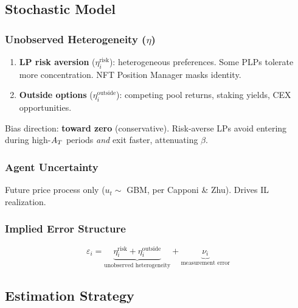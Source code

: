 
\subsection{Stochastic Model}\label{subsec:econ-stochastic}

\subsubsection{Unobserved Heterogeneity ($\eta$)}

\begin{enumerate}
  \item \textbf{LP risk aversion} ($\eta_i^{\text{risk}}$): heterogeneous
    preferences. Some PLPs tolerate more concentration. NFT Position Manager
    masks identity.

  \item \textbf{Outside options} ($\eta_i^{\text{outside}}$): competing pool
    returns, staking yields, CEX opportunities.
\end{enumerate}

Bias direction: \textbf{toward zero} (conservative). Risk-averse LPs avoid
entering during high-$A_T$ periods \emph{and} exit faster, attenuating
$\beta$.

\subsubsection{Agent Uncertainty}

Future price process only ($u_t \sim$ GBM, per Capponi \& Zhu). Drives IL
realization.

\subsubsection{Implied Error Structure}

\begin{equation}\label{eq:error-structure}
  \varepsilon_i =
    \underbrace{\eta_i^{\text{risk}} + \eta_i^{\text{outside}}}_{\text{unobserved heterogeneity}}
    + \underbrace{\nu_i}_{\text{measurement error}}
\end{equation}


\subsection{Estimation Strategy}\label{subsec:econ-estimation}

